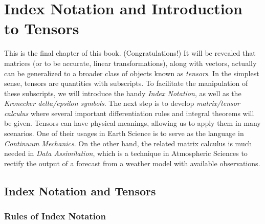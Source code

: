 \chapter{Index Notation and Introduction to Tensors}
\label{chapter:Tensor}

This is the final chapter of this book. (Congratulations!) It will be revealed that matrices (or to be accurate, linear transformations), along with vectors, actually can be generalized to a broader class of objects known as \textit{tensors}. In the simplest sense, tensors are quantities with subscripts. To facilitate the manipulation of these subscripts, we will introduce the handy \textit{Index Notation}, as well as the \textit{Kronecker delta/epsilon symbols}. The next step is to develop \textit{matrix/tensor calculus} where several important differentiation rules and integral theorems will be given. Tensors can have physical meanings, allowing us to apply them in many scenarios. One of their usages in Earth Science is to serve as the language in \textit{Continuum Mechanics}. On the other hand, the related matrix calculus is much needed in \textit{Data Assimilation}, which is a technique in Atmospheric Sciences to rectify the output of a forecast from a weather model with available observations.

\section{Index Notation and Tensors}

\subsection{Rules of Index Notation}

